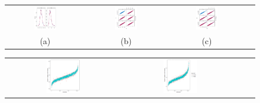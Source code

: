 	
	
	\begin{figure} [ht!]
		\centering
		\begin{tabular}{cccc}
			\includegraphics[width=0.3\textwidth]{plots/densitycase1} &
			\includegraphics[width=0.3\textwidth]{plots/scattercase1hm} &
			\includegraphics[width=0.3\textwidth]{plots/scattercase1wm} \\
			\textnormal{(a)}  & \textnormal{(b)} & \textnormal{(c)}  \\[6pt]
		\end{tabular}
		\begin{tabular}{cccc}
			\includegraphics[width=0.3\textwidth]{plots/distributioncase1hm} &
			\includegraphics[width=0.3\textwidth]{plots/distributioncase1wm} \\

\end{tabular}
\end{figure}

